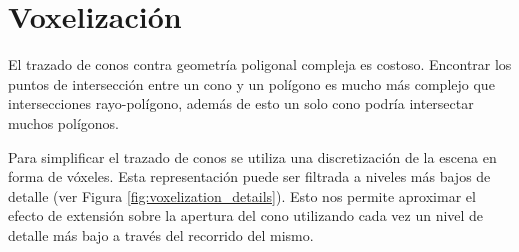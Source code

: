 \section{Voxelización} %
\label{sec:voxelizacion}
El trazado de conos contra geometría poligonal compleja es costoso. Encontrar los puntos de intersección entre un cono y un polígono es mucho más complejo que intersecciones rayo-polígono, además de esto un solo cono podría intersectar muchos polígonos.

Para simplificar el trazado de conos se utiliza una discretización de la escena en forma de vóxeles. Esta representación puede ser filtrada a niveles más bajos de detalle (ver Figura \ref{fig:voxelization_details}). Esto nos permite aproximar el efecto de extensión sobre la apertura del cono utilizando cada vez un nivel de detalle más bajo a través del recorrido del mismo.

